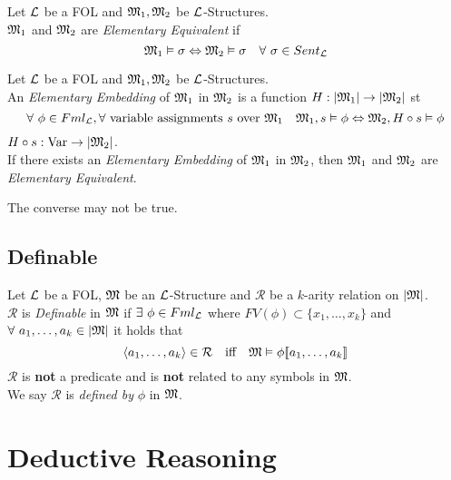 \documentclass[11pt,a4paper]{article}
\begin{document}
Let $\mathcal{L}$ be a FOL and $\mathfrak{M}_1,\mathfrak{M}_2$ be $\mathcal{L}$-Structures.\\
$\mathfrak{M}_1$ and $\mathfrak{M}_2$ are \textit{Elementary Equivalent} if
$$\M_1\vDash\sigma\Leftrightarrow\M_2\vDash\sigma\quad\forall\ \sigma\in Sent_\LL$$


Let $\mathcal{L}$ be a FOL and $\mathfrak{M}_1,\mathfrak{M}_2$ be $\mathcal{L}$-Structures.\\
An \textit{Elementary Embedding} of $\mathfrak{M}_1$ in $\mathfrak{M}_2$ is a function $H:|\mathfrak{M}_1|\to|\mathfrak{M}_2|$ st
$$\forall\ \phi\in Fml_{\mathcal{L}},\forall\ \text{variable assignments }s\text{ over }\mathfrak{M}_1\quad \mathfrak{M}_1,s\vDash\phi\Leftrightarrow\mathfrak{M}_2,H\circ s\vDash\phi$$
\nb $H\circ s:\mathrm{Var}\to|\mathfrak{M}_2|$.\\
\nb If there exists an \textit{Elementary Embedding} of $\mathfrak{M}_1$ in $\mathfrak{M}_2$, then $\mathfrak{M}_1$ and $\mathfrak{M}_2$ are \textit{Elementary Equivalent}.\\


\nb The converse may not be true.

\subsection{Definable}

Let $\mathcal{L}$ be a FOL, $\mathfrak{M}$ be an $\mathcal{L}$-Structure and $\mathcal{R}$ be a $k$-arity relation on $|\mathfrak{M}|$.\\
$\mathcal{R}$ is \textit{Definable} in $\mathfrak{M}$ if $\exists\ \phi\in Fml_{\mathcal{L}}$ where $FV(\phi)\subset\{x_1,\dots,x_k\}$ and $\forall\ a_1,\dots,a_k\in|\mathfrak{M}|$ it holds that
$$\langle a_1,\dots,a_k\rangle\in\mathcal{R}\quad\text{iff}\quad\mathfrak{M}\vDash\phi[\![a_1,\dots,a_k]\!]$$
\nb $\mathcal{R}$ is \textbf{not} a predicate and is \textbf{not} related to any symbols in $\mathfrak{M}$.\\
\nb We say $\mathcal{R}$ is \textit{defined by} $\phi$ in $\mathfrak{M}$.\\


\section{Deductive Reasoning}
\end{document}
